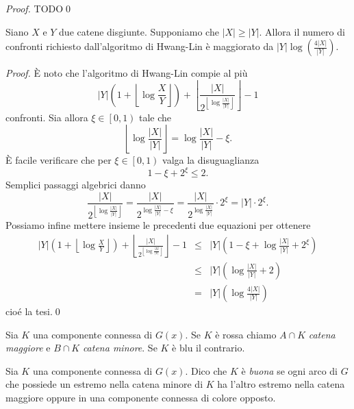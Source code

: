 \begin{lemma}
	\label{consistentlemma} 
\end{lemma}
\begin{proof}
	TODO\qed 
\end{proof}
\begin{lemma}
	\label{hwanglinlemma} Siano \(X\) e \(Y\) due catene disgiunte. Supponiamo che \(|X|\ge|Y|\). Allora il numero di confronti richiesto dall'algoritmo di Hwang-Lin è maggiorato da \(|Y|\log(\frac{4|X|}{|Y|})\). 
\end{lemma}
\begin{proof}
	È noto che l'algoritmo di Hwang-Lin compie al più
	\[|Y|\left(1+\left\lfloor{\log{\frac{X}{Y}}}\right\rfloor\right)+\left\lfloor\frac{|X|}{2^{\left\lfloor\log{\frac{|X|}{|Y|}}\right\rfloor}}\right\rfloor-1\]
	confronti. Sia allora \(\xi\in\left[0,1\right)\) tale che
	\[\left\lfloor\log{\frac{|X|}{|Y|}}\right\rfloor=\log{\frac{|X|}{|Y|}}-\xi.\]
	È facile verificare che per \(\xi\in\left[0,1\right)\) valga la disuguaglianza
	\[1-\xi+2^{\xi}\le 2.\]
	Semplici passaggi algebrici danno
	\[\frac{|X|}{2^{\left\lfloor\log{\frac{|X|}{|Y|}}\right\rfloor}}=\frac{|X|}{2^{\log{\frac{|X|}{|Y|}}-\xi}}=\frac{|X|}{2^{\log{\frac{|X|}{|Y|}}}}\cdot 2^{\xi}=|Y|\cdot 2^{\xi}.\]
	Possiamo infine mettere insieme le precedenti due equazioni per ottenere 
	\begin{eqnarray}
		|Y|\left(1+\left\lfloor{\log{\frac{X}{Y}}}\right\rfloor\right)+\left\lfloor\frac{|X|}{2^{\left\lfloor\log{\frac{|X|}{|Y|}}\right\rfloor}}\right\rfloor-1&\le&|Y|\left(1-\xi+\log{\frac{|X|}{|Y|}}+2^{\xi}\right) \nonumber \\
		&\le& |Y|\left(\log{\frac{|X|}{|Y|}}+2\right) \nonumber \\
		&=& |Y|\left(\log{\frac{4|X|}{|Y|}}\right) \nonumber 
	\end{eqnarray}
	cioé la tesi.\qed 
\end{proof}
\begin{definition}
	Sia \(K\) una componente connessa di \(G(x)\). Se \(K\) è rossa chiamo \(A\cap K\) \emph{catena maggiore} e \(B\cap K\) \emph{catena minore}. Se \(K\) è blu il contrario. 
\end{definition}
\begin{definition}
	Sia \(K\) una componente connessa di \(G(x)\). Dico che \(K\) è \emph{buona} se ogni arco di \(G\) che possiede un estremo nella catena minore di \(K\) ha l'altro estremo nella catena maggiore oppure in una componente connessa di colore opposto. 
\end{definition}
